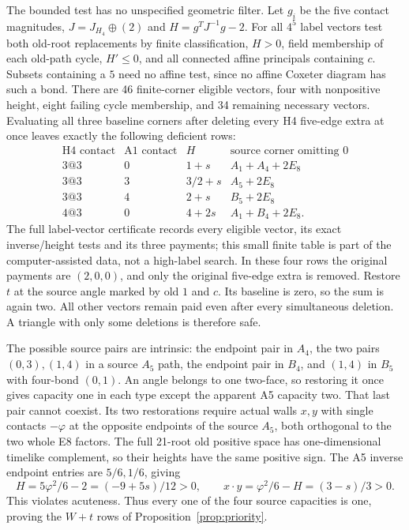 \documentclass[11pt]{article}
\begin{document}
The bounded test has no unspecified geometric filter. Let $g_i$
be the five contact magnitudes, $J=J_{H_4}\oplus(2)$ and
$H=g^TJ^{-1}g-2$. For all $4^5$ label vectors test both old-root
replacements by finite classification, $H>0$, field membership of
each old-path cycle, $H'\le0$, and all connected affine principals
containing $c$. Subsets containing a $5$ need no affine test, since
no affine Coxeter diagram has such a bond. There are 46 finite-corner
eligible vectors, four with nonpositive height, eight failing cycle
membership, and 34 remaining necessary vectors. Evaluating all three
baseline corners after deleting every H4 five-edge extra at once leaves
exactly the following deficient rows:
\[
\begin{array}{c|c|c|c}
\text{H4 contact}&\text{A1 contact}&H&\text{source corner omitting }0\\ \hline
3@3&0&1+s&A_1+A_4+2E_8\\
3@3&3&3/2+s&A_5+2E_8\\
3@3&4&2+s&B_5+2E_8\\
4@3&0&4+2s&A_1+B_4+2E_8.
\end{array}
\]
The full label-vector certificate records every eligible vector, its
exact inverse/height tests and its three payments; this small finite
table is part of the computer-assisted data, not a high-label search.
In these four rows the original payments are $(2,0,0)$, and only the
original five-edge extra is removed. Restore $t$ at the source angle
marked by old $1$ and $c$. Its baseline is zero, so the sum is again
two. All other vectors remain paid even after every simultaneous
deletion. A triangle with only some deletions is therefore safe.

The possible source pairs are intrinsic: the endpoint pair in $A_4$,
the two pairs $(0,3),(1,4)$ in a source $A_5$ path, the endpoint pair
in $B_4$, and $(1,4)$ in $B_5$ with four-bond $(0,1)$.
An angle belongs to one two-face, so restoring it once gives capacity
one in each type except the apparent A5 capacity two. That last pair
cannot coexist. Its two restorations require actual walls $x,y$ with
single contacts $-\varphi$ at the opposite endpoints of the source
$A_5$, both orthogonal to the two whole E8 factors. The full 21-root
old positive space has one-dimensional timelike complement, so their
heights have the same positive sign. The A5 inverse endpoint entries
are $5/6,1/6$, giving
\[
 H=5\varphi^2/6-2=(-9+5s)/12>0,\qquad
 x\cdot y=\varphi^2/6-H=(3-s)/3>0.
\]
This violates acuteness. Thus every one of the four source capacities
is one, proving the $W+t$ rows of Proposition~\ref{prop:priority}.
\end{document}
